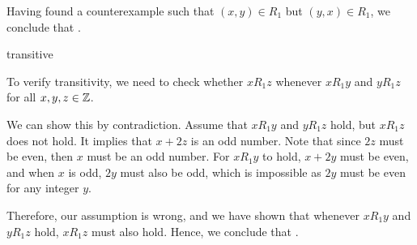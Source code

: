 \documentclass[answers]{exam}
\begin{document}
\begin{questions}
\begin{parts}
\begin{subparts}
\begin{psol}
                Having found a counterexample such that $(x,y)\in R_1$ but $(y, x)\in R_1$,
                we conclude that .
            \end{psol}

            \subpart transitive
            \begin{psol}
                To verify transitivity, we need to check whether $xR_1z$ whenever
                $xR_1y$ and $yR_1z$ for all $x,y,z\in\mathbb{Z}$.
                
                We can show this by contradiction. Assume that $xR_1y$ and $yR_1z$ hold,
                but $xR_1z$ does not hold.
                It implies that $x+2z$ is an odd number. Note that since $2z$ must be even,
                then $x$ must be an odd number. For $xR_1y$ to hold, $x+2y$ must be even,
                and when $x$ is odd, $2y$ must also be odd, which is impossible as $2y$ must
                be even for any integer $y$.

                Therefore, our assumption is wrong, and we have shown that whenever $xR_1y$
                and $yR_1z$ hold, $xR_1z$ must also hold. Hence, we conclude that
                .
            \end{psol}

        \end{subparts}

        

    \end{parts}

\end{questions}
\end{document}

